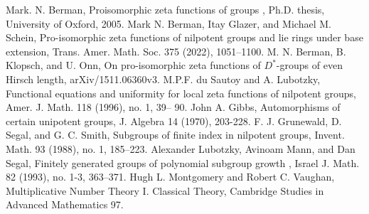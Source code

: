 \documentclass[12pt]{article}
\begin{document}
\begin{thebibliography}{2}
 Mark. N. Berman,
Proisomorphic zeta functions of groups
, Ph.D. thesis, University of Oxford,
2005.
 Mark N. Berman, Itay Glazer, and Michael M. Schein, Pro-isomorphic zeta functions of nilpotent groups and lie rings under base extension, Trans. Amer. Math. Soc. 375 (2022), 1051–1100.
 M. N. Berman, B. Klopsch, and U. Onn,
On pro-isomorphic zeta functions of $D^{\ast}$-groups of even Hirsch length, arXiv/1511.06360v3.
 M.P.F. du Sautoy and A. Lubotzky, Functional equations and uniformity for
local zeta functions of nilpotent groups, Amer. J. Math. 118 (1996), no. 1, 39–
90.
 John A. Gibbs, Automorphisms of certain unipotent groups, J. Algebra 14 (1970), 203-228.
 F. J. Grunewald, D. Segal, and G. C. Smith, Subgroups of finite index in nilpotent groups,
Invent. Math. 93 (1988), no. 1, 185–223.
 Alexander Lubotzky, Avinoam Mann, and Dan Segal,
Finitely generated groups of polynomial
subgroup growth
, Israel J. Math.
82
(1993), no. 1-3, 363–371.
 Hugh L. Montgomery and Robert C. Vaughan, Multiplicative Number Theory I. Classical Theory, Cambridge Studies in Advanced Mathematics 97.
\end{thebibliography}
\end{document}
